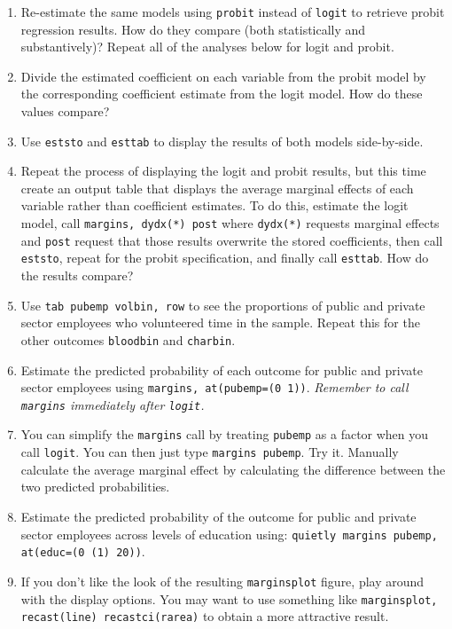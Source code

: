 \documentclass[a4paper,12pt]{article}
\begin{document}
\begin{enumerate}
\item Re-estimate the same models using \texttt{probit} instead of \texttt{logit} to retrieve probit regression results. How do they compare (both statistically and substantively)? Repeat all of the analyses below for logit and probit.

\item Divide the estimated coefficient on each variable from the probit model by the corresponding coefficient estimate from the logit model. How do these values compare?

\item Use \texttt{eststo} and \texttt{esttab} to display the results of both models side-by-side.

\item Repeat the process of displaying the logit and probit results, but this time create an output table that displays the average marginal effects of each variable rather than coefficient estimates. To do this, estimate the logit model, call \texttt{margins, dydx(*) post} where \texttt{dydx(*)} requests marginal effects and \texttt{post} request that those results overwrite the stored coefficients, then call \texttt{eststo}, repeat for the probit specification, and finally call \texttt{esttab}. How do the results compare?

\item Use \texttt{tab pubemp volbin, row} to see the proportions of public and private sector employees who volunteered time in the sample. Repeat this for the other outcomes \texttt{bloodbin} and \texttt{charbin}.

\item Estimate the predicted probability of each outcome for public and private sector employees using \texttt{margins, at(pubemp=(0 1))}. {\em Remember to call \texttt{margins} immediately after \texttt{logit}.}

\item You can simplify the \texttt{margins} call by treating \texttt{pubemp} as a factor when you call \texttt{logit}. You can then just type \texttt{margins pubemp}. Try it. Manually calculate the average marginal effect by calculating the difference between the two predicted probabilities.

\item Estimate the predicted probability of the outcome for public and private sector employees across levels of education using: \texttt{quietly margins pubemp, at(educ=(0 (1) 20))}.

\item If you don't like the look of the resulting \texttt{marginsplot} figure, play around with the display options. You may want to use something like \texttt{marginsplot, recast(line) recastci(rarea)} to obtain a more attractive result.


\end{enumerate}
\end{document}
